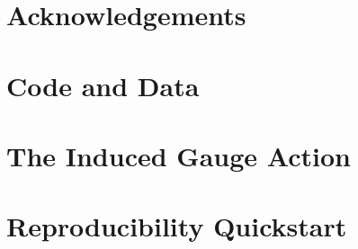 \documentclass[12pt, letterpaper]{article}
\begin{document}
\section*{Acknowledgements}


\appendix

\section{Code and Data}


\section{The Induced Gauge Action}


\section{Reproducibility Quickstart}




\end{document}
